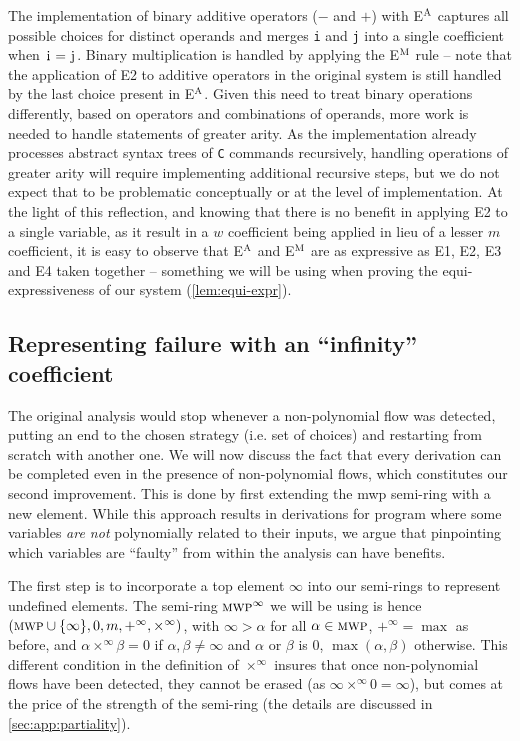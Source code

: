 \documentclass[runningheads]{llncs}
\makeatletter
\newcommand{\pr}{\lstinline[mathescape]}
\newcommand*{\ie}{i.e.\@\xspace}
\makeatother
\begin{document}
The implementation of binary additive operators (\(-\) and \(+\)) with E\(^{\textsc{A}}\) captures all possible choices for distinct operands and merges \pr|i| and \pr|j| into a single coefficient when \(\text{\pr|i|}= \text{\pr|j|}\).
Binary multiplication is handled by applying the E\(^{\textsc{M}}\) rule -- note that the application of E2 to additive operators in the original system is still handled by the last choice present in E\(^{\textsc{A}}\).
Given this need to treat binary operations differently, based on operators and combinations of operands, more work is needed to handle statements of greater arity.
As the implementation already processes abstract syntax trees of \texttt{C} commands recursively, handling operations of greater arity will require implementing additional recursive steps, but we do not expect that to be problematic conceptually or at the level of implementation.
At the light of this reflection, and knowing that there is no benefit in applying E2 to a single variable, as it result in a \(w\) coefficient being applied in lieu of a lesser \(m\) coefficient, it is easy to observe that E\(^{\textsc{A}}\) and E\(^{\textsc{M}}\) are as expressive as E1, E2, E3 and E4 taken together -- something we will be using when proving the equi-expressiveness of our system (\autoref{lem:equi-expr}).

\subsection{Representing failure with an \enquote{infinity} coefficient}

The original analysis would stop whenever a non-polynomial flow was detected, putting an end to the chosen strategy (\ie set of choices) and restarting from scratch with another one.
We will now discuss the fact that every derivation can be completed even in the presence of non-polynomial flows, which constitutes our second improvement.
This is done by first extending the mwp semi-ring with a new element. While this approach results in derivations for program where some variables \emph{are not} polynomially related to their inputs, we argue that pinpointing which variables are \enquote{faulty} from within the analysis can have benefits.

The first step is to incorporate a top element
\(\infty\) into our semi-rings to represent undefined elements. %
The semi-ring \(\textsc{mwp}^\infty\) we will be using is hence \((\textsc{mwp} \cup \{\infty\}, 0, m, +^{\infty}, \times^{\infty})\), with \(\infty > \alpha\) for all \(\alpha \in \textsc{mwp}\), \(+^{\infty}=\max\) as before, and \(\alpha \times^{\infty} \beta = 0\) if \(\alpha, \beta \neq \infty\) and \(\alpha\) or \(\beta\) is \(0\), \(\max(\alpha, \beta)\) otherwise.
This different condition in the definition of \(\times^{\infty}\) insures that once non-polynomial flows have been detected, they cannot be erased (as \(\infty \times^{\infty} 0 = \infty\)), but comes at the price of the strength of the semi-ring (the details are discussed in \autoref{sec:app:partiality}).
\end{document}
